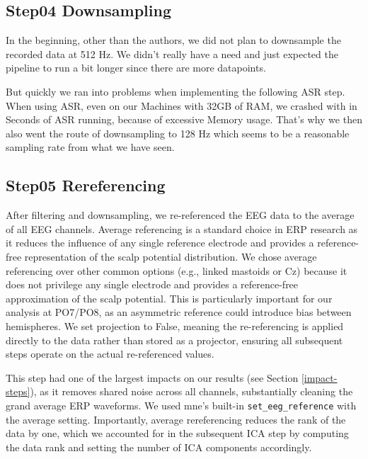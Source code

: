 \documentclass{scrartcl}
\begin{document}
\subsection{Step04 Downsampling}
In the beginning, other than the authors, we did not plan to downsample the recorded data at 512 Hz.
We didn't really have a need and just expected the pipeline to run a bit longer since there are more datapoints.

But quickly we ran into problems when implementing the following ASR step.
When using ASR, even on our Machines with 32GB of RAM, we crashed with in Seconds of ASR running, because of excessive Memory usage.
That's why we then also went the route of downsampling to 128 Hz which seems to be a reasonable sampling rate from what we have seen.

\subsection{Step05 Rereferencing}
After filtering and downsampling, we re-referenced the EEG data to the average of all EEG channels. Average referencing is a standard choice in ERP research as it reduces the influence of any single reference electrode and provides a reference-free representation of the scalp potential distribution. We chose average referencing over other common options (e.g., linked mastoids or Cz) because it does not privilege any single electrode and provides a reference-free approximation of the scalp potential. This is particularly important for our analysis at PO7/PO8, as an asymmetric reference could introduce bias between hemispheres. We set projection to False, meaning the re-referencing is applied directly to the data rather than stored as a projector, ensuring all subsequent steps operate on the actual re-referenced values.

 This step had one of the largest impacts on our results (see Section \ref{impact-steps}), as it removes shared noise across all channels, substantially cleaning the grand average ERP waveforms. We used mne's built-in \texttt{set\_eeg\_reference} with the average setting. Importantly, average rereferencing reduces the rank of the data by one, which we accounted for in the subsequent ICA step by computing the data rank and setting the number of ICA components accordingly. 
\end{document}
